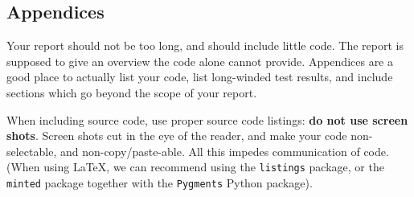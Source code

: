 \subsection{Appendices}

\label{sec:appendices}

Your report should not be too long, and should include little code. The report
is supposed to give an overview the code alone cannot provide. Appendices are a
good place to actually list your code, list long-winded test results, and
include sections which go beyond the scope of your report.

When including source code, use proper source code listings: \textbf{do not use
screen shots}. Screen shots cut in the eye of the reader, and make your code
non-selectable, and non-copy/paste-able. All this impedes communication of
code. (When using \LaTeX, we can recommend using the \texttt{listings} package,
or the \texttt{minted} package together with the \texttt{Pygments} Python
package).
